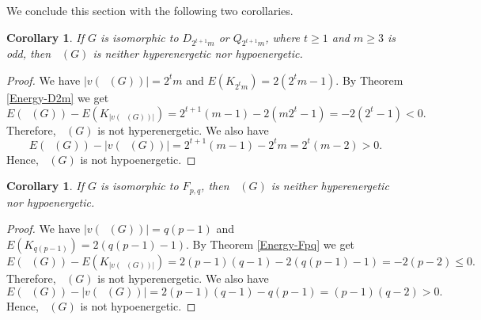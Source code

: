 \documentclass[reqno,12pt]{amsart}
\theoremstyle{plain}
\newtheorem{cor}[thm]{Corollary}
\theoremstyle{definition}
\newcommand{\coeng}{\mathop{\mathcal{E}_c^-}}
\begin{document}
 We conclude this section with the following two corollaries.
\begin{cor}
	If $G$ is isomorphic to   $D_{2^{t+1}m}$ or  $Q_{2^{t+1}m}$, where $t \geq 1$ and $m \geq 3$ is odd, then 
	$\coeng(G)$ is neither hyperenergetic nor hypoenergetic.
\end{cor}

\begin{proof}
	We have $|v(\coeng(G))| = 2^tm$ and 
	$
	E(K_{2^tm}) = 2(2^tm - 1).
	$
	By Theorem \ref{Energy-D2m} we get
	\[
	E(\coeng(G)) - E(K_{|v(\coeng(G))|}) = 2^{t+1}(m-1) - 2(m2^t - 1)
	= -2(2^t - 1) < 0. 
	\]
	Therefore, $\coeng(G)$ is not hyperenergetic. We also have
	\[
	E(\coeng(G)) - |v(\coeng(G))| = 2^{t+1}(m-1) - 2^tm
	= 2^t(m - 2) > 0.
	\]
	Hence, $\coeng(G)$ is not hypoenergetic.
\end{proof}




\begin{cor}
If $G$ is isomorphic to   $F_{p, q}$, then 
 $\coeng(G)$ is neither hyperenergetic nor hypoenergetic.
\end{cor}

\begin{proof}
We have $|v(\coeng(G))| = q(p-1)$ and
$
E(K_{q(p-1)}) = 2(q(p-1)-1).
$
By Theorem \ref{Energy-Fpq} we get
\[
E(\coeng(G)) - E(K_{|v(\coeng(G))|}) = 2(p - 1)(q-1) - 2(q(p-1)-1)
	= -2(p - 2) \leq 0. 
\]
Therefore, $\coeng(G)$ is not hyperenergetic. We also have
\[
E(\coeng(G)) - |v(\coeng(G))| = 2(p - 1)(q-1) - q(p - 1) 
	= (p - 1)(q - 2) > 0.
\]
Hence, $\coeng(G)$ is not hypoenergetic.
\end{proof}
\end{document}
